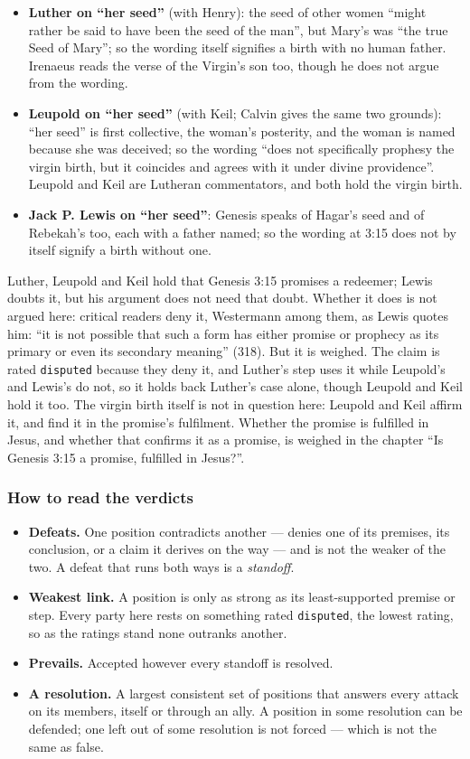 \documentclass[11pt]{article}
\begin{document}
\begin{itemize}
  \item \textbf{Luther on “her seed”} (with Henry): the seed of other women “might rather be said to have been the seed of the man”, but Mary’s was “the true Seed of Mary”; so the wording itself signifies a birth with no human father. Irenaeus reads the verse of the Virgin’s son too, though he does not argue from the wording.
  \item \textbf{Leupold on “her seed”} (with Keil; Calvin gives the same two grounds): “her seed” is first collective, the woman’s posterity, and the woman is named because she was deceived; so the wording “does not specifically prophesy the virgin birth, but it coincides and agrees with it under divine providence”. Leupold and Keil are Lutheran commentators, and both hold the virgin birth.
  \item \textbf{Jack P. Lewis on “her seed”}: Genesis speaks of Hagar’s seed and of Rebekah’s too, each with a father named; so the wording at 3:15 does not by itself signify a birth without one.
\end{itemize}
Luther, Leupold and Keil hold that Genesis 3:15 promises a redeemer; Lewis doubts it, but his argument does not need that doubt. Whether it does is not argued here: critical readers deny it, Westermann among them, as Lewis quotes him: “it is not possible that such a form has either promise or prophecy as its primary or even its secondary meaning” (318). But it is weighed. The claim is rated \texttt{disputed} because they deny it, and Luther’s step uses it while Leupold’s and Lewis’s do not, so it holds back Luther’s case alone, though Leupold and Keil hold it too. The virgin birth itself is not in question here: Leupold and Keil affirm it, and find it in the promise’s fulfilment. Whether the promise is fulfilled in Jesus, and whether that confirms it as a promise, is weighed in the chapter “Is Genesis 3:15 a promise, fulfilled in Jesus?”.

\subsubsection*{How to read the verdicts}
\begin{itemize}
  \item \textbf{Defeats.} One position contradicts another — denies one of its premises, its conclusion, or a claim it derives on the way — and is not the weaker of the two. A defeat that runs both ways is a \emph{standoff}.
  \item \textbf{Weakest link.} A position is only as strong as its least-supported premise or step. Every party here rests on something rated \texttt{disputed}, the lowest rating, so as the ratings stand none outranks another.
  \item \textbf{Prevails.} Accepted however every standoff is resolved.
  \item \textbf{A resolution.} A largest consistent set of positions that answers every attack on its members, itself or through an ally. A position in some resolution can be defended; one left out of some resolution is not forced — which is not the same as false.
\end{itemize}
\end{document}
